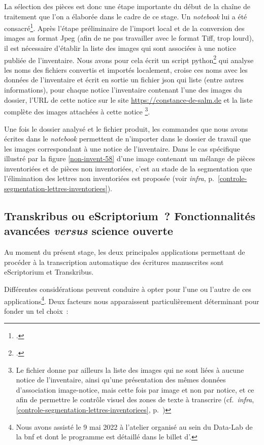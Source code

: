 \documentclass[a4paper,12pt,twoside]{book}
\begin{document}
				La sélection des pièces est donc une étape importante du début de la chaîne de traitement que l'on a élaborée dans le cadre de ce stage. Un \textit{notebook} lui a été consacré\footcite{biayPreparerTraitementDossier2022}. Après l'étape préliminaire de l'import local et de la conversion des images au format Jpeg (afin de ne pas travailler avec le format Tiff, trop lourd), il est nécessaire d'établir la liste des images qui sont associées à une notice publiée de l'inventaire. Nous avons pour cela écrit un script python\footcite{biayDonneesImagesPy2022} qui analyse les noms des fichiers convertis et importés localement, croise ces noms avec les données de l'inventaire et écrit en sortie un fichier \gls{json} qui liste (entre autres informations), pour chaque notice l'inventaire contenant l'une des images du dossier, l'URL de cette notice sur le site \url{https://constance-de-salm.de} et la liste complète des images attachées à cette notice
				\footnote{Le fichier donne par ailleurs la liste des images qui ne sont liées à aucune notice de l'inventaire, ainsi qu'une présentation des mêmes données d'association image-notice, mais cette fois par image et non par notice, et ce afin de permettre le contrôle visuel des zones de texte à transcrire (cf.~\textit{infra}, \ref{controle-segmentation-lettres-inventoriees}, p.~\pageref{controle-segmentation-lettres-inventoriees})}.
				
				Une fois le dossier analysé et le fichier produit, les commandes que nous avons écrites dans le \textit{notebook} permettent de n'importer dans le dossier de travail que les images correspondant à une notice de l'inventaire. Dans le cas spécifique illustré par la figure \ref{non-invent-58} d'une image contenant un mélange de pièces inventoriées et de pièces non inventoriées, c'est au stade de la segmentation que l'élimination des lettres non inventoriées est proposée (voir \textit{infra}, p.~\ref{controle-segmentation-lettres-inventoriees}).
							
			\subsection[Transkribus ou eScriptorium~?]{Transkribus ou eScriptorium~? Fonctionnalités avancées \textit{versus} science ouverte}
				Au moment du présent stage, les deux principales applications permettant de procéder à la transcription automatique des écritures manuscrites sont eScriptorium et Transkribus.
				
				Différentes considérations peuvent conduire à opter pour l'une ou l'autre de ces applications\footnote{Nous avons assisté le 9 mai 2022 à l'atelier organisé au sein du Data-Lab de la \gls{bnf} et dont le programme est détaillé dans le billet d'\cite{jacquotTranskribusEScriptoriumTranscrire}.}. Deux facteurs nous apparaissent particulièrement déterminant pour fonder un tel choix~:
				
\end{document}
